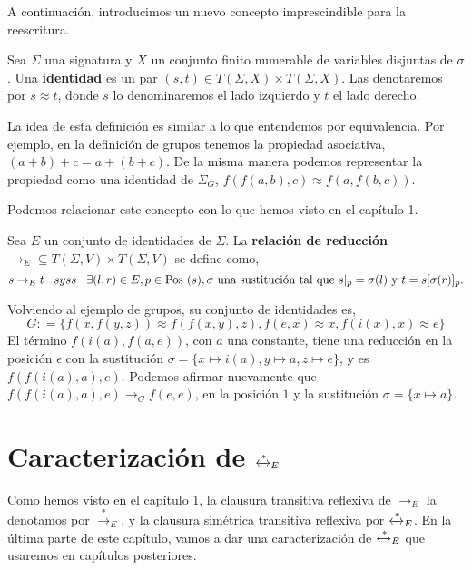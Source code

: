 A continuación, introducimos un nuevo concepto imprescindible para la reescritura.

\begin{defi}
  Sea $\Sigma$ una signatura y $X$ un conjunto finito numerable de variables
  disjuntas de $\sigma$. Una \textbf{identidad} es un par
  $(s,t) \in T(\Sigma, X) \times T(\Sigma, X)$. Las denotaremos por
  $s \approx t$, donde $s$ lo denominaremos el lado izquierdo y $t$ el lado
  derecho.
\end{defi} 

La idea de esta definición es similar a lo que entendemos por
equivalencia. Por ejemplo, en la definición de grupos tenemos la
propiedad asociativa, $(a+b)+c =a+(b+c)$. De la misma manera podemos
representar la propiedad como una identidad de $\Sigma_G$,
$f(f(a,b),c) \approx f(a,f(b,c))$.

Podemos relacionar este concepto con lo que hemos visto en el capítulo 1.

\begin{defi}
  Sea $E$ un conjunto de identidades de $\Sigma$. La \textbf{relación de
  reducción} $\rightarrow_E \subseteq T(\Sigma, V) \times T(\Sigma, V)$
  se define como,
  \[
    s \rightarrow_E t \hspace{.3cm} syss \hspace{.3cm} \exists(l,r)
    \in E, p \in \mbox{Pos } (s), \sigma \text{ una sustitución tal que } s|_p = \sigma(l) \text{ y } t=
    s[\sigma(r)]_p.
  \]
\end{defi}

Volviendo al ejemplo de grupos, su conjunto de identidades es,
\[
  G : = \{f(x,f(y,z)) \approx f(f(x,y),z), f(e,x) \approx x, f(i(x),x)
  \approx e \}
\]
El término $f(i(a), f(a,e))$, con $a$ una constante, tiene una
reducción en la posición $\epsilon$ con la sustitución
$\sigma = \{x \mapsto i(a), y \mapsto a, z \mapsto e \}$, y es
$f(f(i(a),a),e)$. Podemos afirmar nuevamente que
$f(f(i(a),a),e) \rightarrow_G f(e,e)$, en la posición $1$ y la
sustitución $\sigma = \{x \mapsto a \}$.



\section{Caracterización de $\xleftrightarrow{*}_E$}

Como hemos visto en el capítulo 1, la clausura transitiva reflexiva de
$\rightarrow_E$ la denotamos por $\xrightarrow{*}_E$, y la clausura
simétrica transitiva reflexiva por $\xleftrightarrow{*}_E$. En la
última parte de este capítulo, vamos a dar una caracterización de
$\xleftrightarrow{*}_E$ que usaremos en capítulos posteriores.

